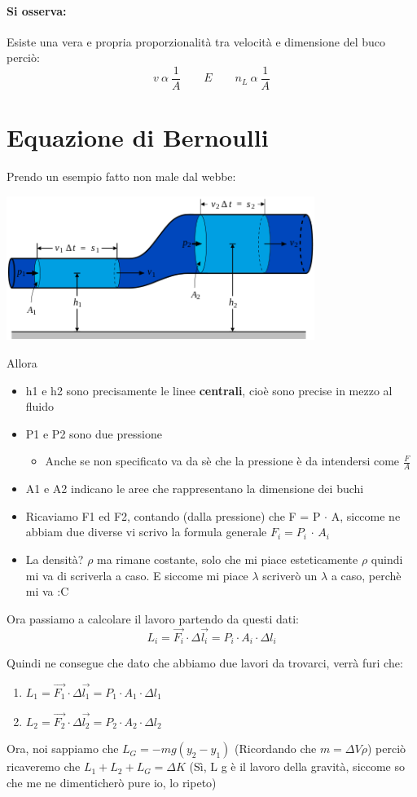 \documentclass[12pt, a4paper, openany, oneside]{book}
\begin{document}
\paragraph{Si osserva: }Esiste una vera e propria proporzionalità tra velocità 
e dimensione del buco perciò:
\[
v ~ \alpha ~ \frac{1}{A} ~~~~~~~~~ E ~~~~~~~~~ n_{L} ~ \alpha ~ \frac{1}{A}
\] 
\section{Equazione di Bernoulli}
Prendo un esempio fatto non male dal webbe: 
\begin{center}
\includegraphics[width=0.75\textwidth]{12}
\end{center}
Allora
\begin{itemize}
	\item h1 e h2 sono precisamente le linee \textbf{centrali}, cioè sono 
	precise in mezzo al fluido
	\item P1 e P2 sono due pressione
	\begin{itemize}
		\item Anche se non specificato va da sè che la pressione è da intendersi
		come $\frac{F}{A}$
	\end{itemize}
	\item A1 e A2 indicano le aree che rappresentano la dimensione dei buchi
	\item Ricaviamo F1 ed F2, contando (dalla pressione) che F = P $\cdot$ A,
	siccome ne abbiam due diverse vi scrivo la formula generale 
	$F_{i} = P_{i}$ $\cdot$ $A_{i}$ 
	\item La densità? $\rho$ ma rimane costante, solo che mi piace esteticamente
	$\rho$ quindi mi va di scriverla a caso. E siccome mi piace $\lambda$ scriverò
	un $\lambda$ a caso, perchè mi va :C
\end{itemize}
Ora passiamo a calcolare il lavoro partendo da questi dati:
\[L_{i} = \overrightarrow{F_{i}}\cdot\Delta \overrightarrow{l_{i}} = P_{i} 
\cdot A_{i} \cdot \Delta l_{i} \]

Quindi ne consegue che dato che abbiamo due lavori da trovarci, verrà furi che:
\begin{enumerate}
	\item $L_{1} = \overrightarrow{F_{1}}\cdot\Delta \overrightarrow{l_{1}} = 
	P_{1} \cdot A_{1} \cdot \Delta l_{1} $
	\item $L_{2} = \overrightarrow{F_{2}}\cdot\Delta \overrightarrow{l_{2}} = 
	P_{2} \cdot A_{2} \cdot \Delta l_{2} $
\end{enumerate}
Ora, noi sappiamo che $L_{G} = -mg(y_2 - y_1)$ (Ricordando che $m = \Delta V \rho$)
perciò ricaveremo che $L_{1} + L_{2} + L_{G} = \Delta K$ (Sì, L g è il lavoro 
della gravità, siccome so che me ne dimenticherò pure io, lo ripeto)
\end{document}
